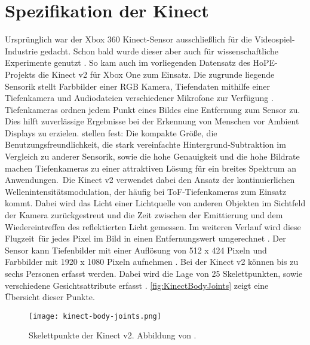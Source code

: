 \section{Spezifikation der Kinect}
\label{2-SpezifikationKinect}
Ursprünglich war der Xbox 360 Kinect-Sensor ausschließlich für die Videospiel-Industrie gedacht.
Schon bald wurde dieser aber auch für wissenschaftliche Experimente genutzt \citep{tolgyessy_evaluation_2021}.
So kam auch im vorliegenden Datensatz des HoPE-Projekts die Kinect v2 für Xbox One zum Einsatz.
Die zugrunde liegende Sensorik stellt Farbbilder einer \ac{RGB} Kamera, Tiefendaten mithilfe einer Tiefenkamera
und Audiodateien verschiedener Mikrofone zur Verfügung \citep{windows-developer-center_microsoft_corporation_human_2014}.
Tiefenkameras ordnen jedem Punkt eines Bildes eine Entfernung zum Sensor zu.
Dies hilft zuverlässige Ergebnisse bei der Erkennung von Menschen vor Ambient Displays zu erzielen.
\citet{li_time-flight_2014} stellen fest:
\glqq Die kompakte Größe, die Benutzungsfreundlichkeit,
die stark vereinfachte Hintergrund-Subtraktion im Vergleich zu anderer Sensorik, sowie die hohe Genauigkeit
und die hohe Bildrate machen Tiefenkameras zu einer attraktiven Lösung für ein breites Spektrum an Anwendungen.\grqq\
Die Kinect v2 verwendet dabei den Ansatz der kontinuierlichen Wellenintensitätsmodulation,
der häufig bei \ac{ToF}-Tiefenkameras zum Einsatz kommt.
Dabei wird das Licht einer Lichtquelle von anderen Objekten im Sichtfeld der Kamera zurückgestreut
und die Zeit zwischen der Emittierung und dem Wiedereintreffen des reflektierten Licht gemessen.
Im weiteren Verlauf wird diese \glqq Flugzeit\grqq\ für jedes Pixel im Bild in einen Entfernungswert umgerechnet \citep{tolgyessy_evaluation_2021}.
Der Sensor kann Tiefenbilder mit einer Auflösung von 512 x 424 Pixeln
und Farbbilder mit 1920 x 1080 Pixeln aufnehmen \citep{marin_multi-camera_2019}.
Bei der Kinect v2 können bis zu sechs Personen erfasst werden.
Dabei wird die Lage von 25 Skelettpunkten, sowie verschiedene Gesichtsattribute erfasst \citep{windows-developer-center_microsoft_corporation_human_2014}.
\autoref{fig:KinectBodyJoints} zeigt eine Übersicht dieser Punkte. 
\begin{figure}[ht]
  \begin{center}
  \texttt{[image: kinect-body-joints.png]}
  \end{center}
  \caption{Skelettpunkte der Kinect v2. Abbildung von \citet{windows-developer-center_microsoft_corporation_human_2014}.}
  \label{fig:KinectBodyJoints}
\end{figure}

